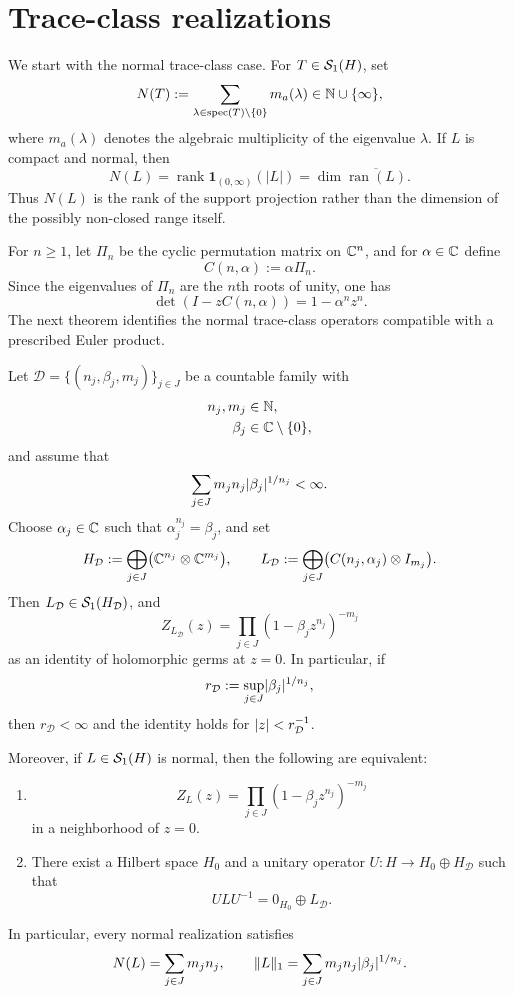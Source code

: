 \section{Trace-class realizations}\label{sec:fredholm}

We start with the normal trace-class case. For \(T\in \mathcal S_1(H)\), set
\[
  N(T):=\sum_{\lambda\in\operatorname{spec}(T)\setminus\{0\}}m_a(\lambda)
  \in \mathbb{N}\cup\{\infty\},
\]
where \(m_a(\lambda)\) denotes the algebraic multiplicity of the
eigenvalue \(\lambda\). If \(L\) is compact and normal, then
\[
  N(L)
  =\operatorname{rank}\mathbf 1_{(0,\infty)}(|L|)
  =\dim\overline{\operatorname{ran}(L)}.
\]
Thus \(N(L)\) is the rank of the support projection rather than the
dimension of the possibly non-closed range itself.

For \(n\ge 1\), let \(\Pi_n\) be the cyclic permutation matrix on
\(\mathbb{C}^n\), and for \(\alpha\in\mathbb{C}\) define
\[
  C(n,\alpha):=\alpha\Pi_n.
\]
Since the eigenvalues of \(\Pi_n\) are the \(n\)th roots of unity, one
has
\begin{equation}\label{eq:cycle-block-det}
  \det(I-zC(n,\alpha))=1-\alpha^n z^n.
\end{equation}
The next theorem identifies the normal trace-class operators compatible
with a prescribed Euler product.

\begin{theorem}
  \label{thm:cyclic-fredholm-realisation}
  Let
  \(
    \mathcal D=\{(n_j,\beta_j,m_j)\}_{j\in J}
  \)
  be a countable family with
  \[
    \begin{aligned}
      n_j,m_j&\in\mathbb{N},\\
      \beta_j&\in\mathbb{C}\setminus\{0\},
    \end{aligned}
  \]
  and assume that
  \[
    \sum_{j\in J}m_j n_j\lvert \beta_j \rvert^{1/n_j}<\infty.
  \]
  Choose \(\alpha_j\in\mathbb{C}\) such that \(\alpha_j^{n_j}=\beta_j\), and
  set
  \[
    H_{\mathcal D}
    :=\bigoplus_{j\in J}\bigl(\mathbb{C}^{n_j}\otimes\mathbb{C}^{m_j}\bigr),
    \qquad
    L_{\mathcal D}
    :=\bigoplus_{j\in J}\bigl(C(n_j,\alpha_j)\otimes I_{m_j}\bigr).
  \]
  Then \(L_{\mathcal D}\in \mathcal S_1(H_{\mathcal D})\), and
  \[
    Z_{L_{\mathcal D}}(z)
    =\prod_{j\in J}(1-\beta_j z^{n_j})^{-m_j}
  \]
  as an identity of holomorphic germs at \(z=0\). In particular, if
  \[
    r_{\mathcal D}:=\sup_{j\in J}\lvert \beta_j \rvert^{1/n_j},
  \]
  then \(r_{\mathcal D}<\infty\) and the identity holds for
  \(\lvert z \rvert<r_{\mathcal D}^{-1}\).

  Moreover, if \(L\in \mathcal S_1(H)\) is normal, then the following are
  equivalent:
  \begin{enumerate}[label=\textup{(\roman*)}]
    \item
      \[
        Z_L(z)
        =\prod_{j\in J}(1-\beta_j z^{n_j})^{-m_j}
      \]
      in a neighborhood of \(z=0\).
    \item There exist a Hilbert space \(H_0\) and a unitary operator
      \(U:H\to H_0\oplus H_{\mathcal D}\) such that
      \[
        ULU^{-1}=0_{H_0}\oplus L_{\mathcal D}.
      \]
  \end{enumerate}
  In particular, every normal realization satisfies
  \[
    N(L)=\sum_{j\in J}m_jn_j,
    \qquad
    \|L\|_1=\sum_{j\in J}m_jn_j\lvert \beta_j \rvert^{1/n_j}.
  \]
\end{theorem}

